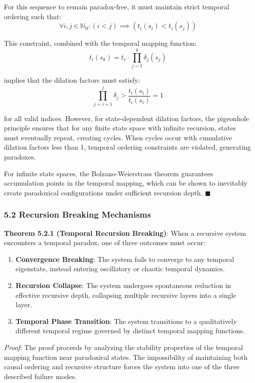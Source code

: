 \documentclass[
]{article}
\begin{document}
For this sequence to remain paradox-free, it must maintain strict
temporal ordering such that:
\[\forall i,j \in \mathbb{N}_0 : (i < j) \implies (t_i(s_i) < t_i(s_j))\]

This constraint, combined with the temporal mapping function:
\[t_i(s_k) = t_e \cdot \prod_{j=1}^{k} \delta_j(s_j)\]

implies that the dilation factors must satisfy:
\[\prod_{j=i+1}^{j} \delta_j > \frac{t_i(s_i)}{t_i(s_i)} = 1\]

for all valid indices. However, for state-dependent dilation factors,
the pigeonhole principle ensures that for any finite state space with
infinite recursion, states must eventually repeat, creating cycles. When
cycles occur with cumulative dilation factors less than 1, temporal
ordering constraints are violated, generating paradoxes.

For infinite state spaces, the Bolzano-Weierstrass theorem guarantees
accumulation points in the temporal mapping, which can be shown to
inevitably create paradoxical configurations under sufficient recursion
depth. \(\blacksquare \)

\subsubsection{5.2 Recursion Breaking
Mechanisms}\label{recursion-breaking-mechanisms}

\textbf{Theorem 5.2.1 (Temporal Recursion Breaking)}: When a recursive
system encounters a temporal paradox, one of three outcomes must occur:

\begin{enumerate}
\def\labelenumi{\arabic{enumi}.}
\item
  \textbf{Convergence Breaking}: The system fails to converge to any
  temporal eigenstate, instead entering oscillatory or chaotic temporal
  dynamics.
\item
  \textbf{Recursion Collapse}: The system undergoes spontaneous
  reduction in effective recursive depth, collapsing multiple recursive
  layers into a single layer.
\item
  \textbf{Temporal Phase Transition}: The system transitions to a
  qualitatively different temporal regime governed by distinct temporal
  mapping functions.
\end{enumerate}

\emph{Proof}: The proof proceeds by analyzing the stability properties
of the temporal mapping function near paradoxical states. The
impossibility of maintaining both causal ordering and recursive
structure forces the system into one of the three described failure
modes.
\end{document}
